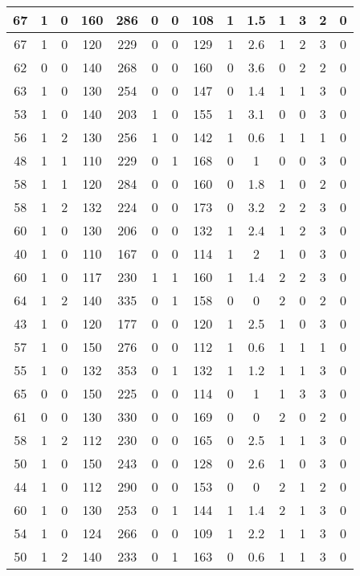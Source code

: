 \documentclass{article}
\begin{document}
\begin{longtable}{|c|c|c|c|c|c|c|c|c|c|c|c|c|c|}
\hline
67 & 1 & 0 & 160 & 286 & 0 & 0 & 108 & 1 & 1.5 & 1 & 3 & 2 & 0\\
\hline
67 & 1 & 0 & 120 & 229 & 0 & 0 & 129 & 1 & 2.6 & 1 & 2 & 3 & 0\\
\hline
62 & 0 & 0 & 140 & 268 & 0 & 0 & 160 & 0 & 3.6 & 0 & 2 & 2 & 0\\
\hline
63 & 1 & 0 & 130 & 254 & 0 & 0 & 147 & 0 & 1.4 & 1 & 1 & 3 & 0\\
\hline
53 & 1 & 0 & 140 & 203 & 1 & 0 & 155 & 1 & 3.1 & 0 & 0 & 3 & 0\\
\hline
56 & 1 & 2 & 130 & 256 & 1 & 0 & 142 & 1 & 0.6 & 1 & 1 & 1 & 0\\
\hline
48 & 1 & 1 & 110 & 229 & 0 & 1 & 168 & 0 & 1 & 0 & 0 & 3 & 0\\
\hline
58 & 1 & 1 & 120 & 284 & 0 & 0 & 160 & 0 & 1.8 & 1 & 0 & 2 & 0\\
\hline
58 & 1 & 2 & 132 & 224 & 0 & 0 & 173 & 0 & 3.2 & 2 & 2 & 3 & 0\\
\hline
60 & 1 & 0 & 130 & 206 & 0 & 0 & 132 & 1 & 2.4 & 1 & 2 & 3 & 0\\
\hline
40 & 1 & 0 & 110 & 167 & 0 & 0 & 114 & 1 & 2 & 1 & 0 & 3 & 0\\
\hline
60 & 1 & 0 & 117 & 230 & 1 & 1 & 160 & 1 & 1.4 & 2 & 2 & 3 & 0\\
\hline
64 & 1 & 2 & 140 & 335 & 0 & 1 & 158 & 0 & 0 & 2 & 0 & 2 & 0\\
\hline
43 & 1 & 0 & 120 & 177 & 0 & 0 & 120 & 1 & 2.5 & 1 & 0 & 3 & 0\\
\hline
57 & 1 & 0 & 150 & 276 & 0 & 0 & 112 & 1 & 0.6 & 1 & 1 & 1 & 0\\
\hline
55 & 1 & 0 & 132 & 353 & 0 & 1 & 132 & 1 & 1.2 & 1 & 1 & 3 & 0\\
\hline
65 & 0 & 0 & 150 & 225 & 0 & 0 & 114 & 0 & 1 & 1 & 3 & 3 & 0\\
\hline
61 & 0 & 0 & 130 & 330 & 0 & 0 & 169 & 0 & 0 & 2 & 0 & 2 & 0\\
\hline
58 & 1 & 2 & 112 & 230 & 0 & 0 & 165 & 0 & 2.5 & 1 & 1 & 3 & 0\\
\hline
50 & 1 & 0 & 150 & 243 & 0 & 0 & 128 & 0 & 2.6 & 1 & 0 & 3 & 0\\
\hline
44 & 1 & 0 & 112 & 290 & 0 & 0 & 153 & 0 & 0 & 2 & 1 & 2 & 0\\
\hline
60 & 1 & 0 & 130 & 253 & 0 & 1 & 144 & 1 & 1.4 & 2 & 1 & 3 & 0\\
\hline
54 & 1 & 0 & 124 & 266 & 0 & 0 & 109 & 1 & 2.2 & 1 & 1 & 3 & 0\\
\hline
50 & 1 & 2 & 140 & 233 & 0 & 1 & 163 & 0 & 0.6 & 1 & 1 & 3 & 0\\

\end{longtable}
\end{document}
